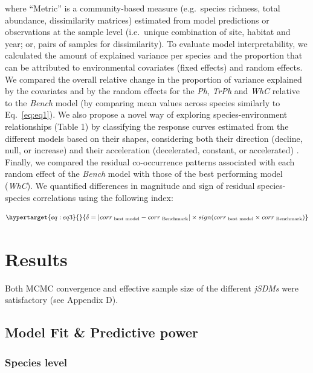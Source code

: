 \begin{refsection}
where ``Metric'' is a community-based measure (e.g.~species richness,
total abundance, dissimilarity matrices) estimated from model
predictions or observations at the sample level (i.e.~unique combination
of site, habitat and year; or, pairs of samples for dissimilarity). To
evaluate model interpretability, we calculated the amount of explained
variance per species and the proportion that can be attributed to
environmental covariates (fixed effects) and random effects. We compared
the overall relative change in the proportion of variance explained by
the covariates and by the random effects for the \emph{Ph}, \emph{TrPh}
and \emph{WhC} relative to the \emph{Bench} model (by comparing mean
values across species similarly to Eq.~\ref{eq:eq1}). We also propose a
novel way of exploring species-environment relationships (Table 1) by
classifying the response curves estimated from the different models
based on their shapes, considering both their direction (decline, null,
or increase) and their acceleration (decelerated, constant, or
accelerated) \autocite{Rigal_2020}. Finally, we compared the residual
co-occurrence patterns associated with each random effect of the
\emph{Bench} model with those of the best performing model (\emph{WhC}).
We quantified differences in magnitude and sign of residual
species-species correlations using the following index:

\begin{equation}\protect\hypertarget{eq:eq3}{}{\delta = |corr_{\text{ best model}} - corr_{\text{ Benchmark}}| \times sign(corr_{\text{ best model}} \times corr_{\text{ Benchmark}})}\label{eq:eq3}\end{equation}



\hypertarget{results}{%
\section{Results}\label{results}}

Both MCMC convergence and effective sample size of the different
\emph{jSDMs} were satisfactory (see Appendix D).

\hypertarget{model-fit-predictive-power}{%
\subsection{Model Fit \& Predictive
power}\label{model-fit-predictive-power}}

\hypertarget{species-level}{%
\subsubsection{Species level}\label{species-level}}


\end{refsection}
